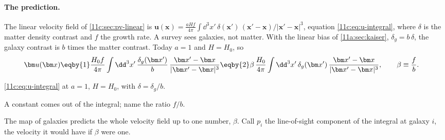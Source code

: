 \paragraph{The prediction.} The linear velocity field of \cref{11c:sec:pv-linear} is
$\bm u(\bm x)=\frac{aHf}{4\pi}\int\dd^3x'\,\delta(\bm x')\,(\bm x'-\bm x)/|\bm x'-\bm x|^3$,
equation \eqref{11c:eq:u-integral}, where $\delta$ is the matter density contrast and $f$ the
growth rate. A survey sees galaxies, not matter. With the linear bias of
\cref{11a:sec:kaiser}, $\delta_g=b\,\delta$, the galaxy contrast is $b$ times the matter
contrast. Today $a=1$ and $H=H_0$, so
\begin{align}
  \bm u(\bm x)
  &\eqby{1}\frac{H_0f}{4\pi}\int\dd^3x'\,\frac{\delta_g(\bm x')}{b}\,
   \frac{\bm x'-\bm x}{|\bm x'-\bm x|^3}
   \eqby{2}\beta\,\frac{H_0}{4\pi}\int\dd^3x'\,\delta_g(\bm x')\,
   \frac{\bm x'-\bm x}{|\bm x'-\bm x|^3},
  \qquad \beta\equiv\frac fb .
  \label{11c:eq:beta-field}
\end{align}
\begin{explain}
  \item \eqref{11c:eq:u-integral} at $a=1$, $H=H_0$, with $\delta=\delta_g/b$.
  \item A constant comes out of the integral; name the ratio $f/b$.
\end{explain}
The map of galaxies predicts the whole velocity field up to one number, $\beta$. Call
$p_i$ the line-of-sight component of the integral at galaxy $i$, the velocity it would
have if $\beta$ were one.

